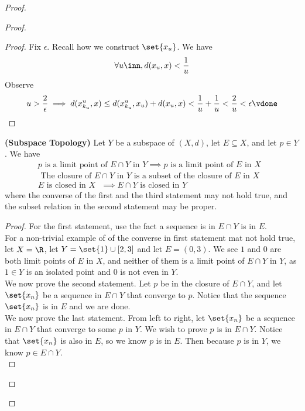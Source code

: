 \documentclass{report}
\begin{document}
\begin{proof}
\begin{proof}
\begin{proof}
Fix $\epsilon $. Recall how we construct $\set{x_u}$. We have
\begin{equation*}
\forall u\inn, d(x_u,x)<\frac{1}{u}
\end{equation*}
Observe  
\begin{equation*}
u>\frac{2}{\epsilon }\implies d(x^u_{k_u},x)\leq d(x^u_{k_u},x_u)+d(x_u,x)<\frac{1}{u}+\frac{1}{u}<\frac{2}{u}<\epsilon \vdone
\end{equation*}
\end{proof}
\begin{theorem}
\label{3.2.11}
\textbf{(Subspace Topology)} Let $Y$ be a subspace of  $(X,d)$, let $E\subseteq X$, and let $p\in Y$. We have
\begin{gather*}
p\text{ is a limit point of $E\cap Y$ in }Y\implies p\text{ is a limit point of $E$ in  $X$ }\\
\text{ The closure of $E\cap Y$  in $Y$ is a subset of the closure of $E$ in $X$ }\\
E\text{ is closed in $X$ }\implies  E\cap Y\text{ is closed in $Y$ }
\end{gather*}
where the converse of the first and the third statement may not hold true, and the subset relation in the second statement may be proper. 
\end{theorem}
\begin{proof}
For the first statement, use the fact a sequence is in $E\cap Y$ is in $E$.\\

For a non-trivial example of of the converse in first statement mat not hold true, let $X=\R$, let $Y=\set{1}\cup [2,3]$ and let $E=(0,3)$. We see $1$ and $0$ are both limit points of $E$ in $X$, and neither of them is a limit point of  $E\cap Y$ in $Y$, as $1\in Y$ is an isolated point and $0$ is not even in $Y$.\\

We now prove the second statement. Let $p$ be in the closure of $E\cap Y$, and let $\set{x_n}$ be a sequence in $E\cap Y$ that converge to $p$. Notice that the sequence $\set{x_n}$ is in $E$ and we are done.\\

We now prove the last statement. From left to right, let $\set{x_n}$ be a sequence in $E\cap Y$ that converge to some $p$ in $Y$. We wish to prove  $p$ is in  $E\cap Y$. Notice that $\set{x_n}$ is also in $E$, so we know  $p$ is in $E$. Then because $p$ is in $Y$, we know  $p\in  E\cap Y$.\\


\end{proof}
\end{proof}
\end{proof}
\end{document}
